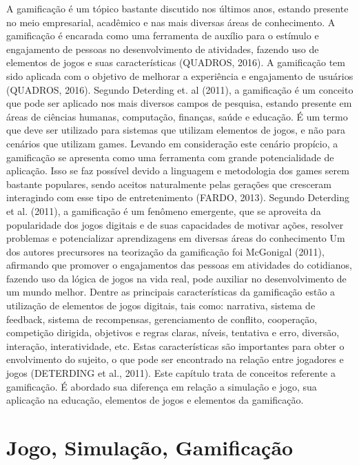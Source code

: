 \documentclass[
	12pt,				%
	oneside,			%
	a4paper,			%
	english,			%
	french,				%
	spanish,			%
	brazil,				%
	]{abntex2}
\begin{document}
A gamificação é um tópico bastante discutido nos últimos anos, estando presente no meio empresarial, acadêmico e nas mais diversas áreas de conhecimento. A gamificação é encarada como uma ferramenta de auxílio para o estímulo e engajamento de pessoas no desenvolvimento de atividades, fazendo uso de elementos de jogos e suas características (QUADROS, 2016).
	A gamificação tem sido aplicada com o objetivo de melhorar a experiência e engajamento de usuários (QUADROS, 2016). Segundo Deterding et. al (2011), a gamificação é um conceito que pode ser aplicado nos mais diversos campos de pesquisa, estando presente em áreas de ciências humanas, computação, finanças, saúde e educação. É um termo que deve ser utilizado para sistemas que utilizam elementos de jogos, e não para cenários que utilizam games. 
	Levando em consideração este cenário propício, a gamificação se apresenta como uma ferramenta com grande potencialidade de aplicação. Isso se faz possível devido a linguagem e metodologia dos games serem bastante populares, sendo aceitos naturalmente pelas gerações que cresceram interagindo com esse tipo de entretenimento (FARDO, 2013). Segundo Deterding et al. (2011), a gamificação é um fenômeno emergente, que se aproveita da popularidade dos jogos digitais e de suas capacidades de motivar ações, resolver problemas e potencializar aprendizagens em diversas áreas do conhecimento
	Um dos autores precursores na teorização da gamificação foi McGonigal (2011), afirmando que promover o engajamentos das pessoas em atividades do cotidianos, fazendo uso da lógica de jogos na vida real, pode auxiliar no desenvolvimento de um mundo melhor.
Dentre as principais características da gamificação estão a utilização de elementos de jogos digitais, tais como: narrativa, sistema de feedback, sistema de recompensas, gerenciamento de conflito, cooperação, competição dirigida, objetivos e regras claras, níveis, tentativa e erro, diversão, interação, interatividade, etc. Estas características são importantes para obter o envolvimento do sujeito, o que pode ser encontrado na relação entre jogadores e jogos (DETERDING et al., 2011).
Este capítulo trata de conceitos referente a gamificação. É abordado sua diferença em relação a simulação e jogo, sua aplicação na educação, elementos de jogos e elementos da gamificação.

\section{Jogo, Simulação, Gamificação}
\end{document}
